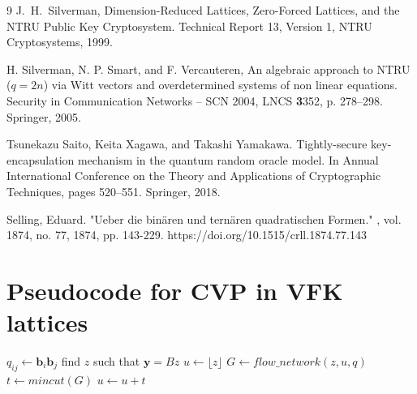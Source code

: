 \documentclass{amsart}
\numberwithin{equation}{section}
\def\L{\mathcal{L}}
\begin{document}
\begin{thebibliography}{9}
 J.~H.~Silverman, Dimension-Reduced Lattices, Zero-Forced Lattices, and the NTRU Public Key Cryptosystem. Technical Report 13, Version 1, NTRU Cryptosystems, 1999.

 H. Silverman, N. P. Smart, and F. Vercauteren, An algebraic approach to NTRU ($q = 2n$) via Witt vectors and overdetermined systems of non linear equations. Security in Communication Networks -- SCN 2004, LNCS {\textbf 3352}, p. 278--298. Springer, 2005.

 Tsunekazu Saito, Keita Xagawa, and Takashi Yamakawa. Tightly-secure key-encapsulation mechanism in the quantum random oracle model. In Annual International Conference on the Theory and Applications of Cryptographic Techniques, pages 520--551. Springer, 2018.

 Selling, Eduard. "Ueber die binären und ternären quadratischen Formen." , vol. 1874, no. 77, 1874, pp. 143-229. https://doi.org/10.1515/crll.1874.77.143

\end{thebibliography}

\appendix
\newpage
\section{Pseudocode for CVP in VFK lattices}\label{appendixA}

{}

\begin{algorithm}[H]
\caption{Solving CVP in VFK lattices}\label{alg:MAINALGO}

\Output{A closest vector $\textbf{v} \in \L$ of $\textbf{y}$}

$q_{ij} \gets \textbf{b}_i \textbf{b}_j$ 
find $z$ such that $\textbf{y} = Bz$ 
$u \gets \lfloor z \rfloor$\;
 {
  $G\gets flow\_network(z,u, q)$ 
  $t\gets mincut(G)$ 
  $u\gets u+t$\;
}
\end{algorithm}
\end{document}
